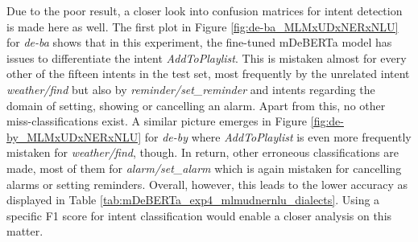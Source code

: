 \documentclass[11pt,a4paper,twoside,openright]{scrbook}
\begin{document}
Due to the poor result, a closer look into confusion matrices for intent detection is made here as well. The first plot in Figure \ref{fig:de-ba_MLMxUDxNERxNLU} for \textit{de-ba} shows that in this experiment, the fine-tuned mDeBERTa model has issues to differentiate the intent \textit{AddToPlaylist}. This is mistaken almost for every other of the fifteen intents in the test set, most frequently by the unrelated intent \textit{weather/find} but also by \textit{reminder/set\_reminder} and intents regarding the domain of setting, showing or cancelling an alarm. Apart from this, no other miss-classifications exist. A similar picture emerges in Figure \ref{fig:de-by_MLMxUDxNERxNLU} for \textit{de-by} where \textit{AddToPlaylist} is even more frequently mistaken for \textit{weather/find}, though. In return, other erroneous classifications are made, most of them for \textit{alarm/set\_alarm} which is again mistaken for cancelling alarms or setting reminders. Overall, however, this leads to the lower accuracy as displayed in Table \ref{tab:mDeBERTa_exp4_mlmudnernlu_dialects}. Using a specific F1 score for intent classification would enable a closer analysis on this matter.

\begin{table}[!ht]
\caption{Results for the extended multi-task MLMxUDxNERxNLU experiment with mDeBERTa according to Upper German dialects over three random seeds, Avg. = average on languages without English, German and Swiss German, Diff. = average performance difference to mDeBERTa baseline, sd = standard deviation}
\label{tab:mDeBERTa_exp4_mlmudnernlu_dialects}
\end{table}
\end{document}
